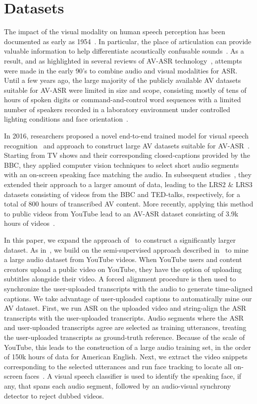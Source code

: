 \documentclass{article}
\newcommand{\negsectionspace}{\vspace{-4pt}}
\begin{document}
\negsectionspace
\section{Datasets}
\label{Datasets}
\negsectionspace
The impact of the visual modality on human speech perception has been
documented as early as 1954~\citet{sumby54}. In particular, the place
of articulation can provide valuable information to help differentiate
acoustically confusable sounds~\citet{massaro98}. As a result, and as
highlighted in several reviews of AV-ASR
technology~\citet{Potamianos03,Czyzewski2017}, attempts were made in
the early 90's to combine audio and visual modalities for ASR. Until a
few years ago, the large majority of the publicly available
AV datasets suitable for AV-ASR were limited in size and scope,
consisting mostly of tens of hours of spoken digits or
command-and-control word sequences with a limited number of speakers
recorded in a laboratory environment under controlled lighting
conditions and face orientation~\citet{Czyzewski2017}.

In 2016, researchers proposed a novel end-to-end trained model for
visual speech recognition~\citet{assael2016lipnet} and approach to
construct large AV datasets suitable for
AV-ASR~\citet{Chung16}. Starting from TV shows and their corresponding
closed-captions provided by the BBC, they applied computer vision
techniques to select short audio segments with an on-screen speaking
face matching the audio. In subsequent
studies~\citet{Chung17,Chung17a}, they extended their approach to a
larger amount of data, leading to the LRS2 \& LRS3 datasets consisting
of videos from the BBC and TED-talks, respectively, for a total of 800
hours of transcribed AV content.  More recently, applying this method
to public videos from YouTube lead to an AV-ASR dataset consisting of
3.9k hours of videos~\citet{dm_lsvsr_2018}.

In this paper, we expand the approach of~\citet{dm_lsvsr_2018} to
construct a significantly larger dataset. As in~\citet{dm_lsvsr_2018},
we build on the semi-supervised approach described
in~\cite{liao13asru} to mine a large audio dataset from YouTube
videos. When YouTube users and content creators upload a public video
on YouTube, they have the option of uploading subtitles alongside
their video. A forced alignment procedure is then used to synchronize
the user-uploaded transcripts with the audio to generate time-aligned
captions. We take advantage of user-uploaded captions to automatically
mine our AV dataset. First, we run ASR on the uploaded video and
string-align the ASR transcripts with the user-uploaded
transcripts. Audio segments where the ASR and user-uploaded
transcripts agree are selected as training utterances, treating the
user-uploaded transcripts as ground-truth reference. Because of the
scale of YouTube, this leads to the construction of a large audio
training set, in the order of 150k hours of data for American
English. Next, we extract the video snippets corresponding to the
selected utterances and run face tracking to locate all on-screen
faces~\citet{cloud_api,facenet15schroff}. A visual speech classifier
is used to identify the speaking face, if any, that spans each audio
segment, followed by an audio-visual synchrony detector to reject
dubbed videos.
\end{document}
